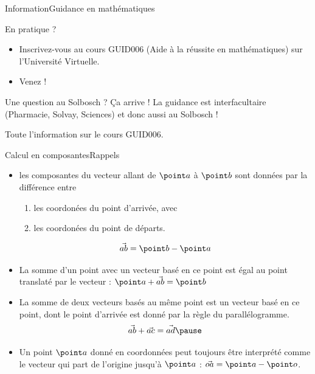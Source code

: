 \documentclass[french,xcolor=svgnames]{beamer}
\begin{document}
\begin{frame}{Information}{Guidance en mathématiques}
  \begin{block}{En pratique ?}
    \begin{itemize}
    \item Inscrivez-vous au cours GUID006 (\og Aide à la réussite en mathématiques\fg) sur l'Université Virtuelle.
    \item Venez !
    \end{itemize}
  \end{block}
  \begin{block}{Une question au Solbosch ? Ça arrive !}
     La guidance est interfacultaire (\textcolor{ulb-pharma}{Pharmacie}, \textcolor{ulb-sbs}{Solvay}, \textcolor{ulb-sciences}{Sciences}) et donc aussi au Solbosch !

     Toute l'information sur le cours GUID006.
  \end{block}
\end{frame}
\begin{frame}{Calcul en composantes}{Rappels}
  \begin{itemize}
  \item les composantes du vecteur allant de $\point a$ à $\point b$\pause{} sont données par la différence entre\pause{}
    \begin{enumerate}
    \item les coordonées du point d'arrivée, avec\pause{}
    \item les coordonées du point de départs.\pause
    \end{enumerate}
    \begin{equation*}
      \vec{ab} = \point b - \point a
    \end{equation*}
  \item La somme d'un point avec un vecteur basé en ce point\pause{} est égal au point translaté par le vecteur :\pause{} $\point a + \vec{ab} = \point b$\pause
  \item La somme de deux vecteurs basés au même point\pause{} est un vecteur basé en ce point, dont le point d'arrivée est donné\pause{} par la règle du parallélogramme.\pause
    \begin{equation*}
      \vec{ab} + \vec{ac} = \vec{ad}\pause
    \end{equation*}
  \item Un point $\point a$ donné en coordonnées\pause{} peut toujours être interprété comme le vecteur\pause{} qui part de l'origine jusqu'à $\point a$\pause{} : $\vec{oa} = \point a - \point o$.
  \end{itemize}
\end{frame}
\end{document}
